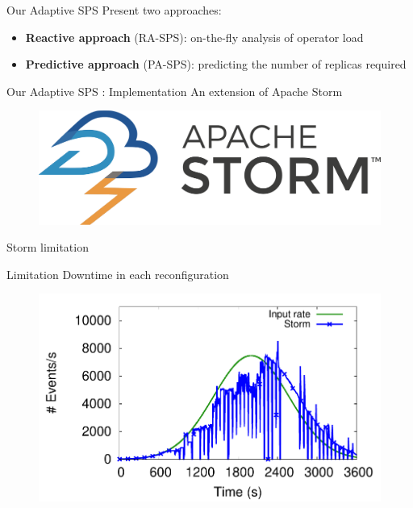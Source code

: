 \begin{frame}{Our Adaptive SPS}
	Present two approaches:
	\begin{itemize}
		\item \textbf{Reactive approach} (RA-SPS): on-the-fly analysis of operator load
		\item \textbf{Predictive approach} (PA-SPS): predicting the number of replicas required
	\end{itemize}
\end{frame}

\begin{frame}{Our Adaptive SPS : Implementation}	
	An extension of Apache Storm	
		
	\begin{figure}
		\includegraphics[scale=0.15]{images/concepts/Storm.png}
	\end{figure}
\end{frame}	

\begin{frame}{Storm limitation}	
	\begin{alertblock}{Limitation}
		Downtime in each reconfiguration	
	\end{alertblock}
	
	\begin{figure}
		\includegraphics[scale=0.5]{images/problems/Pool.pdf}
	\end{figure}	
\end{frame}

